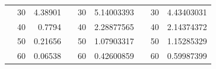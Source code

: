 \begin{table}[]
\begin{tabular}{|ccrccrccr|}
\rowcolor[HTML]{DAE8FC} 
\multicolumn{1}{|c|}{\cellcolor[HTML]{FFFFC7}}                       & \multicolumn{1}{c|}{\cellcolor[HTML]{DAE8FC}30}        & \multicolumn{1}{r|}{\cellcolor[HTML]{DAE8FC}4.38901}    & \multicolumn{1}{c|}{\cellcolor[HTML]{FFFFC7}}                       & \multicolumn{1}{c|}{\cellcolor[HTML]{DAE8FC}30}        & \multicolumn{1}{r|}{\cellcolor[HTML]{DAE8FC}5.14003393} & \multicolumn{1}{c|}{\cellcolor[HTML]{FFFFC7}}                       & \multicolumn{1}{c|}{\cellcolor[HTML]{DAE8FC}30}        & 4.43403031                                              \\ \cline{2-3} \cline{5-6} \cline{8-9} 
\rowcolor[HTML]{DDFDFF} 
\multicolumn{1}{|c|}{\cellcolor[HTML]{FFFFC7}}                       & \multicolumn{1}{c|}{\cellcolor[HTML]{DDFDFF}40}        & \multicolumn{1}{r|}{\cellcolor[HTML]{DDFDFF}0.7794}     & \multicolumn{1}{c|}{\cellcolor[HTML]{FFFFC7}}                       & \multicolumn{1}{c|}{\cellcolor[HTML]{DDFDFF}40}        & \multicolumn{1}{r|}{\cellcolor[HTML]{DDFDFF}2.28877565} & \multicolumn{1}{c|}{\cellcolor[HTML]{FFFFC7}}                       & \multicolumn{1}{c|}{\cellcolor[HTML]{DDFDFF}40}        & 2.14374372                                              \\ \cline{2-3} \cline{5-6} \cline{8-9} 
\rowcolor[HTML]{DAE8FC} 
\multicolumn{1}{|c|}{\cellcolor[HTML]{FFFFC7}}                       & \multicolumn{1}{c|}{\cellcolor[HTML]{DAE8FC}50}        & \multicolumn{1}{r|}{\cellcolor[HTML]{DAE8FC}0.21656}    & \multicolumn{1}{c|}{\cellcolor[HTML]{FFFFC7}}                       & \multicolumn{1}{c|}{\cellcolor[HTML]{DAE8FC}50}        & \multicolumn{1}{r|}{\cellcolor[HTML]{DAE8FC}1.07903317} & \multicolumn{1}{c|}{\cellcolor[HTML]{FFFFC7}}                       & \multicolumn{1}{c|}{\cellcolor[HTML]{DAE8FC}50}        & 1.15285329                                              \\ \cline{2-3} \cline{5-6} \cline{8-9} 
\rowcolor[HTML]{DDFDFF} 
\multicolumn{1}{|c|}{\cellcolor[HTML]{FFFFC7}}                       & \multicolumn{1}{c|}{\cellcolor[HTML]{DDFDFF}60}        & \multicolumn{1}{r|}{\cellcolor[HTML]{DDFDFF}0.06538}    & \multicolumn{1}{c|}{\cellcolor[HTML]{FFFFC7}}                       & \multicolumn{1}{c|}{\cellcolor[HTML]{DDFDFF}60}        & \multicolumn{1}{r|}{\cellcolor[HTML]{DDFDFF}0.42600859} & \multicolumn{1}{c|}{\cellcolor[HTML]{FFFFC7}}                       & \multicolumn{1}{c|}{\cellcolor[HTML]{DDFDFF}60}        & 0.59987399                                              \\ \cline{2-3} \cline{5-6} \cline{8-9} 

\end{tabular}
\end{table}
